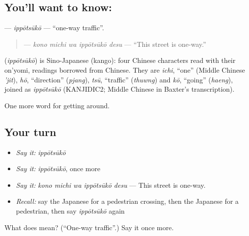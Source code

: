 \subsection*{You'll want to know: }
\textbf{} — \emph{ippōtsūkō} — \textquotedblleft{}one-way traffic\textquotedblright{}.

\begin{quote}
\textbf{  } — \emph{kono michi wa ippōtsūkō desu} — \textquotedblleft{}This street is one-way.\textquotedblright{}
\end{quote}

\begin{cousinweb}
\textbf{} (\emph{ippōtsūkō}) is Sino-Japanese (kango): four Chinese characters read with their on'yomi, readings borrowed from Chinese. They are \emph{ichi}, \textquotedblleft{}one\textquotedblright{} (Middle Chinese \emph{'jit}), \emph{hō}, \textquotedblleft{}direction\textquotedblright{} (\emph{pjang}), \emph{tsū}, \textquotedblleft{}traffic\textquotedblright{} (\emph{thuwng}) and \emph{kō}, \textquotedblleft{}going\textquotedblright{} (\emph{haeng}), joined as \emph{ippōtsūkō} (KANJIDIC2; Middle Chinese in Baxter's transcription).
\end{cousinweb}

\begin{grammarlens}[title={What you've built}]
One more word for getting around.
\end{grammarlens}

\subsection*{Your turn}
\begin{itemize}
\raggedright
  \item \emph{Say it:} \emph{ippōtsūkō}
  \item \emph{Say it:} \emph{ippōtsūkō}, once more
  \item \emph{Say it:} \emph{kono michi wa ippōtsūkō desu} — This street is one-way.
  \item \emph{Recall:} say the Japanese for a pedestrian crossing, then the Japanese for a pedestrian, then say \emph{ippōtsūkō} again
\end{itemize}

\begin{tcolorbox}[breakable,colback=teal!4,colframe=teal!35!black,title={Before you move on}]
What does  mean? (\textquotedblleft{}One-way traffic\textquotedblright{}.) Say it once more.
\end{tcolorbox}

